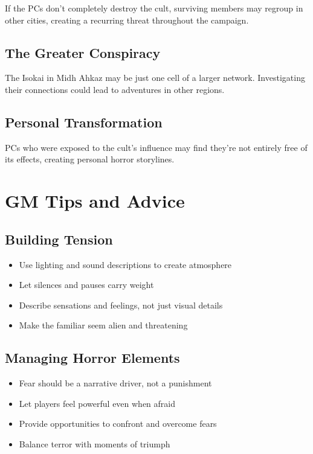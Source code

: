 \documentclass[12pt,twoside]{article}
\begin{document}
If the PCs don't completely destroy the cult, surviving members may regroup in other cities, creating a recurring threat throughout the campaign.

\subsection{The Greater Conspiracy}

The Isokai in Midh Ahkaz may be just one cell of a larger network. Investigating their connections could lead to adventures in other regions.

\subsection{Personal Transformation}

PCs who were exposed to the cult's influence may find they're not entirely free of its effects, creating personal horror storylines.

\section{GM Tips and Advice}

\subsection{Building Tension}

\begin{itemize}
  \item Use lighting and sound descriptions to create atmosphere
  \item Let silences and pauses carry weight
  \item Describe sensations and feelings, not just visual details
  \item Make the familiar seem alien and threatening
\end{itemize}

\subsection{Managing Horror Elements}

\begin{itemize}
  \item Fear should be a narrative driver, not a punishment
  \item Let players feel powerful even when afraid
  \item Provide opportunities to confront and overcome fears
  \item Balance terror with moments of triumph
\end{itemize}
\end{document}
